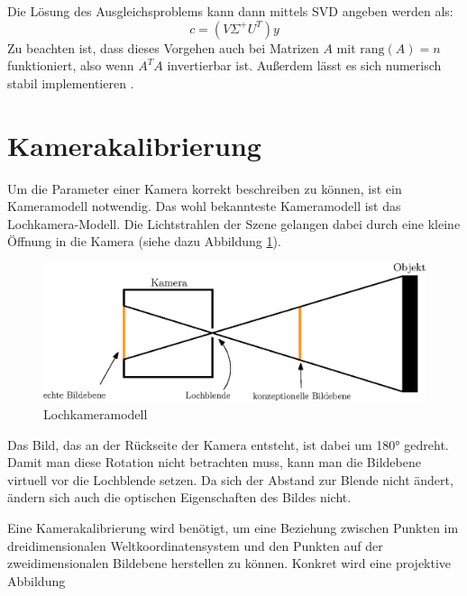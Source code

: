 Die Lösung des Ausgleichsproblems kann dann mittels SVD angeben werden als:
\[
c = \left(V\Sigma^+U^T\right)y
\]
Zu beachten ist, dass dieses Vorgehen auch bei Matrizen $A$ mit $\text{rang}\left(A\right) = n$ funktioniert, also wenn $A^TA$ invertierbar ist. Außerdem lässt es sich numerisch stabil implementieren \cite{Stoer2011}.



\section{Kamerakalibrierung}
\label{s:calib}

Um die Parameter einer Kamera korrekt beschreiben zu können, ist ein Kameramodell notwendig. Das wohl bekannteste Kameramodell ist das Lochkamera-Modell. Die Lichtstrahlen der Szene gelangen dabei durch eine kleine Öffnung in die Kamera (siehe dazu Abbildung \ref{fig:pinhole}).
\begin{figure}[!htb]
	\centering
	\includegraphics[scale=.8]{images/pinhole2.eps}
	\caption{Lochkameramodell}
	\label{fig:pinhole}
\end{figure}

Das Bild, das an der Rückseite der Kamera entsteht, ist dabei um 180° gedreht. Damit man diese Rotation nicht betrachten muss, kann man die Bildebene virtuell vor die Lochblende setzen. Da sich der Abstand zur Blende nicht ändert, ändern sich auch die optischen Eigenschaften des Bildes nicht.

Eine Kamerakalibrierung wird benötigt, um eine Beziehung zwischen Punkten im dreidimensionalen Weltkoordinatensystem und den Punkten auf der zweidimensionalen Bildebene herstellen zu können. Konkret wird eine projektive Abbildung

